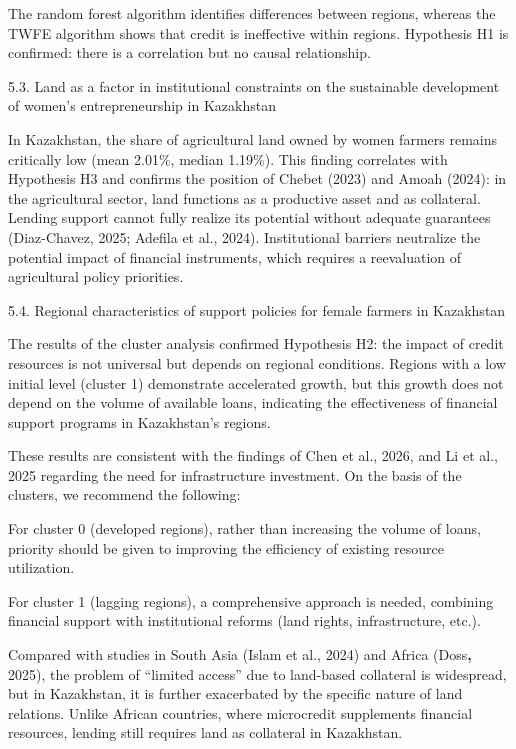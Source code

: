 \documentclass[
]{article}
\begin{document}
The random forest algorithm identifies differences between regions,
whereas the TWFE algorithm shows that credit is ineffective within
regions. Hypothesis H1 is confirmed: there is a correlation but no
causal relationship.

5.3. Land as a factor in institutional constraints on the sustainable
development of women's entrepreneurship in Kazakhstan

In Kazakhstan, the share of agricultural land owned by women farmers
remains critically low (mean 2.01\%, median 1.19\%). This finding
correlates with Hypothesis H3 and confirms the position of Chebet (2023)
and Amoah (2024): in the agricultural sector, land functions as a
productive asset and as collateral. Lending support cannot fully realize
its potential without adequate guarantees (Diaz-Chavez, 2025; Adefila et
al., 2024). Institutional barriers neutralize the potential impact of
financial instruments, which requires a reevaluation of agricultural
policy priorities.

5.4. Regional characteristics of support policies for female farmers in
Kazakhstan

The results of the cluster analysis confirmed Hypothesis H2: the impact
of credit resources is not universal but depends on regional conditions.
Regions with a low initial level (cluster 1) demonstrate accelerated
growth, but this growth does not depend on the volume of available
loans, indicating the effectiveness of financial support programs in
Kazakhstan's regions.

These results are consistent with the findings of Chen et al., 2026, and
Li et al., 2025 regarding the need for infrastructure investment. On the
basis of the clusters, we recommend the following:

For cluster 0 (developed regions), rather than increasing the volume of
loans, priority should be given to improving the efficiency of existing
resource utilization.

For cluster 1 (lagging regions), a comprehensive approach is needed,
combining financial support with institutional reforms (land rights,
infrastructure, etc.).

Compared with studies in South Asia (Islam et al., 2024) and Africa
(Doss\textbf{,} 2025), the problem of ``limited access'' due to
land-based collateral is widespread, but in Kazakhstan, it is further
exacerbated by the specific nature of land relations. Unlike African
countries, where microcredit supplements financial resources, lending
still requires land as collateral in Kazakhstan.
\end{document}
